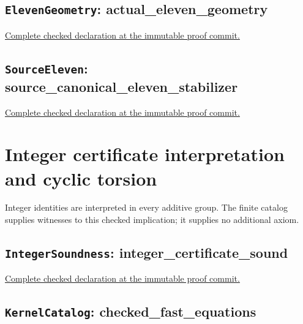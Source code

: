 

\subsection*{\texttt{ElevenGeometry}: actual\_eleven\_geometry}

\noindent\href{https://github.com/alectionary/vibe-math/blob/3ae21c0719cedbd928f4f7882f9b9e266567605e/formalization/distance-preservation/truncated12/ElevenGeometry.lean#L74-L115}{Complete checked declaration at the immutable proof commit.}



\subsection*{\texttt{SourceEleven}: source\_canonical\_eleven\_stabilizer}

\noindent\href{https://github.com/alectionary/vibe-math/blob/3ae21c0719cedbd928f4f7882f9b9e266567605e/formalization/distance-preservation/truncated12/SourceEleven.lean#L15-L51}{Complete checked declaration at the immutable proof commit.}



\clearpage\section{Integer certificate interpretation and cyclic torsion}

Integer identities are interpreted in every additive group. The finite catalog supplies witnesses to this checked implication; it supplies no additional axiom.

\subsection*{\texttt{IntegerSoundness}: integer\_certificate\_sound}

\noindent\href{https://github.com/alectionary/vibe-math/blob/3ae21c0719cedbd928f4f7882f9b9e266567605e/formalization/distance-preservation/truncated12/IntegerSoundness.lean#L11-L22}{Complete checked declaration at the immutable proof commit.}



\subsection*{\texttt{KernelCatalog}: checked\_fast\_equations}

